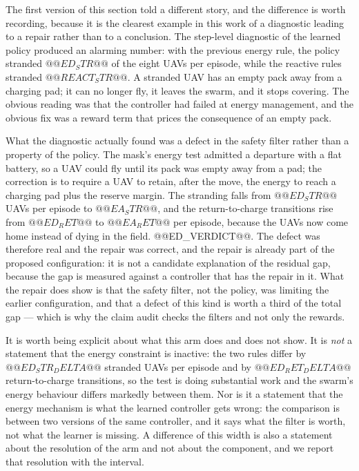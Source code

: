 The first version of this section told a different story, and the
difference is worth recording, because it is the clearest example in this
work of a diagnostic leading to a repair rather than to a conclusion.  The
step-level diagnostic of the learned policy produced an alarming number:
with the previous energy rule, the policy stranded $@@ED_STR@@$ of the
eight UAVs per episode, while the reactive rules stranded $@@REACT_STR@@$.  A
stranded UAV has an empty pack away from a charging pad; it can no longer
fly, it leaves the swarm, and it stops covering.  The obvious reading was
that the controller had failed at energy management, and the obvious fix
was a reward term that prices the consequence of an empty pack.

What the diagnostic actually found was a defect in the safety filter rather
than a property of the policy.  The mask's energy test admitted a
departure with a flat battery, so a UAV could fly until its pack was empty
away from a pad; the correction is to require a UAV to retain, after the
move, the energy to reach a charging pad plus the reserve margin.  The
stranding falls from $@@ED_STR@@$ UAVs per episode to $@@EA_STR@@$, and
the return-to-charge transitions rise from $@@ED_RET@@$ to $@@EA_RET@@$ per
episode, because the UAVs now come home instead of dying in the field.
@@ED_VERDICT@@.  The defect was therefore real and the repair was
correct, and the repair is already part of the proposed configuration: it
is not a candidate explanation of the residual gap, because the gap is
measured against a controller that has the repair in it.  What the repair
does show is that the safety filter, not the policy, was limiting the
earlier configuration, and that a defect of this kind is worth a third of
the total gap --- which is why the claim audit checks the filters and not
only the rewards.

It is worth being explicit about what this arm does and does not show.
It is \emph{not} a statement that the
energy constraint is inactive: the two rules differ by $@@ED_STR_DELTA@@$
stranded UAVs per episode and by $@@ED_RET_DELTA@@$ return-to-charge
transitions, so the test is doing substantial work and the swarm's energy
behaviour differs markedly between them.  Nor is it a statement that the
energy mechanism is what the learned controller gets wrong: the
comparison is between two versions of the same controller, and it says
what the filter is worth, not what the learner is missing.  A
difference of this width is also a statement about the resolution of the
arm and not about the component, and we report that resolution with the
interval.

